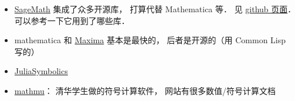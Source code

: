 
\begin{issues}
\issueDraft
\end{issues}

\begin{itemize}
\item \href{https://www.sagemath.org/}{SageMath} 集成了众多开源库， 打算代替 Mathematica 等． 见 \href{https://github.com/sagemath/sage/}{github 页面}． 可以参考一下它用到了哪些库．
\item mathematica 和 \href{https://maxima.sourceforge.io/}{Maxima} 基本是最快的， 后者是开源的（用 Common Lisp 写的）
\item \href{https://juliasymbolics.org/}{JuliaSymbolics}
\item \href{http://mathmu.github.io/MTCAS/RecentChanges.html}{mathmu}： 清华学生做的符号计算软件， 网站有很多数值/符号计算文档
\end{itemize}
